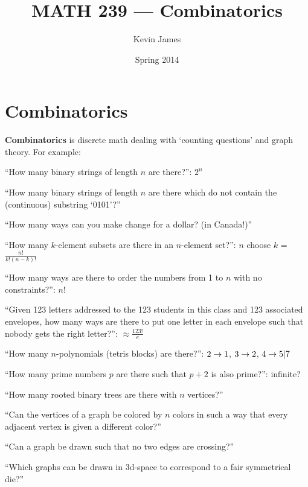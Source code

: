 \documentclass[12pt]{article}
\begin{document}
\title{MATH 239 --- Combinatorics}
\author{Kevin James}
\date{\vspace{-2ex}Spring 2014}
\maketitle\HRule

\tableofcontents
\newpage

\section{Combinatorics}
{\bf Combinatorics} is discrete math dealing with `counting questions' and graph theory. For example:

``How many binary strings of length $n$ are there?'': $2^n$

``How many binary strings of length $n$ are there which do not contain the (continuous) substring `0101'?''

``How many ways can you make change for a dollar? (in Canada!)''

``How many $k$-element subsets are there in an $n$-element set?'': $n$ choose $k$ = $\frac{n!}{k!(n - k)!}$

``How many ways are there to order the numbers from 1 to $n$ with no constraints?'': $n!$

``Given 123 letters addressed to the 123 students in this class and 123 associated envelopes, how many ways are there to put one letter in each envelope such that nobody gets the right letter?'': $\approx \frac{123!}{e}$

``How many $n$-polynomials (tetris blocks) are there?'': $2 \rightarrow 1$, $3 \rightarrow 2$, $4 \rightarrow 5 | 7$

``How many prime numbers $p$ are there such that $p+2$ is also prime?'': infinite?

``How many rooted binary trees are there with $n$ vertices?''

``Can the vertices of a graph be colored by $n$ colors in such a way that every adjacent vertex is given a different color?''

``Can a graph be drawn such that no two edges are crossing?''

``Which graphs can be drawn in 3d-space to correspond to a fair symmetrical die?''
\end{document}
